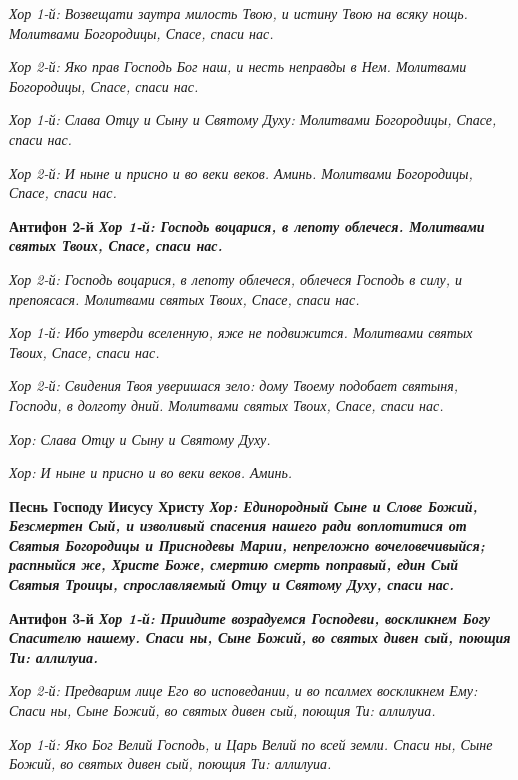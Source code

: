 \itshape Хор 1-й:\normalfont{} Возвещати заутра милость Твою, и истину Твою на всяку нощь. Молитвами Богородицы, Спасе, спаси нас.


\itshape Хор 2-й:\normalfont{} Яко прав Господь Бог наш, и несть неправды в Нем. Молитвами Богородицы, Спасе, спаси нас.


\itshape Хор 1-й:\normalfont{} Слава Отцу и Сыну и Святому Духу: Молитвами Богородицы, Спасе, спаси нас.


\itshape Хор 2-й:\normalfont{} И ныне и присно и во веки веков. Аминь. Молитвами Богородицы, Спасе, спаси нас.


\bfseries Антифон 2-й\normalfont{} \itshape Хор 1-й:\normalfont{} Господь воцарися, в лепоту облечеся. Молитвами святых Твоих, Спасе, спаси нас.


\itshape Хор 2-й:\normalfont{} Господь воцарися, в лепоту облечеся, облечеся Господь в силу, и препоясася. Молитвами святых Твоих, Спасе, спаси нас.


\itshape Хор 1-й:\normalfont{} Ибо утверди вселенную, яже не подвижится. Молитвами святых Твоих, Спасе, спаси нас.


\itshape Хор 2-й:\normalfont{} Свидения Твоя уверишася зело: дому Твоему подобает святыня, Господи, в долготу дний. Молитвами святых Твоих, Спасе, спаси нас.


\itshape Хор:\normalfont{} Слава Отцу и Сыну и Святому Духу.


\itshape Хор:\normalfont{} И ныне и присно и во веки веков. Аминь.


\bfseries  Песнь Господу Иисусу Христу\normalfont{} \itshape Хор:\normalfont{} Единородный Сыне и Слове Божий, Безсмертен Сый, и изволивый спасения нашего ради воплотитися от Святыя Богородицы и Приснодевы Марии, непреложно вочеловечивыйся; распныйся же, Христе Боже, смертию смерть поправый, един Сый Святыя Троицы, спрославляемый Отцу и Святому Духу, спаси нас.


\bfseries Антифон 3-й\normalfont{} \itshape Хор 1-й:\normalfont{} Приидите возрадуемся Господеви, воскликнем Богу Спасителю нашему. Спаси ны, Сыне Божий, во святых дивен сый, поющия Ти: аллилуиа.


\itshape Хор 2-й:\normalfont{} Предварим лице Его во исповедании, и во псалмех воскликнем Ему: Спаси ны, Сыне Божий, во святых дивен сый, поющия Ти: аллилуиа.


\itshape Хор 1-й:\normalfont{} Яко Бог Велий Господь, и Царь Велий по всей земли. Спаси ны, Сыне Божий, во святых дивен сый, поющия Ти: аллилуиа.


